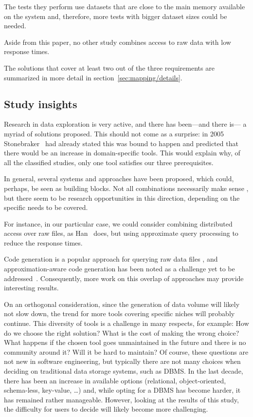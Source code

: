 The tests they perform use datasets that are close
to the main memory available on the system and, therefore, more tests with bigger 
dataset sizes could be needed.

Aside from this paper, no other study combines access to raw data with low
response times.

The solutions that cover at least two out of the three requirements are 
summarized in more detail in section~\ref{sec:mapping/details}.

\subsection{Study insights}
\label{sec:mapping/insights}
Research in data exploration is very active, and there has been---and there is---
a myriad of solutions proposed. This should not come as a surprise:
in 2005 Stonebraker~\cite{Stonebraker2005} had already stated this was bound to
happen and predicted that there would be an increase in domain-specific tools.
This would explain why, of all the classified studies, only one tool satisfies our
three prerequisites.

In general, several systems and approaches have been proposed, which could,
perhaps, be seen as building blocks. Not all combinations necessarily make sense
, but there seem to be research opportunities in this direction, depending
on the specific needs to be covered.

For instance, in our particular case, we could consider combining distributed
access over raw files, as Han~\cite{Han2017} does, but using approximate query
processing to reduce the response times.

Code generation is a popular approach for querying raw data files
, and approximation-aware code generation has been noted as a challenge
yet to be addressed~\cite{Mozafari2017AQP}. Consequently, more work on this
overlap of approaches may provide interesting results.

On an orthogonal consideration, since the generation of data volume will likely
not slow down, the trend for more tools covering specific
niches will probably continue. This diversity of tools is a
challenge in many respects, for example: How do we choose the right solution? What is
the cost of making the wrong choice? What happens if the chosen tool goes
unmaintained in the future and there is no community around it? Will it
be hard to maintain? Of course, these questions are not new in software
engineering, but typically there are not many choices when deciding
on traditional data storage systems, such as DBMS.
In the last decade, there has been an increase in available options
(relational, object-oriented, schema-less, key-value, \ldots) and, while opting
for a DBMS has become harder, it has remained rather manageable. However, looking at the
results of this study, the difficulty for users to decide will likely become
more challenging.

